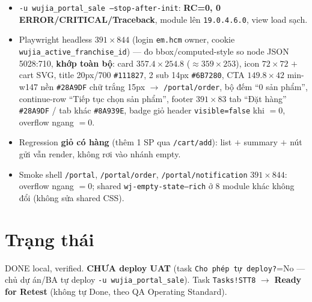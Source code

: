 \begin{itemize}
  \item \texttt{-u wujia\_portal\_sale --stop-after-init}: \textbf{RC=0, 0
    ERROR/CRITICAL/Traceback}, module lên \texttt{19.0.4.6.0}, view load sạch.
  \item Playwright headless $391\times844$ (login \texttt{em.hcm} owner, cookie
    \texttt{wujia\_active\_franchise\_id}) --- đo bbox/computed-style so node JSON 5028:710,
    \textbf{khớp toàn bộ}: card $357.4\times254.8$ ($\approx359\times253$), icon $72\times72$
    $+$ cart SVG, title 20px/700 \texttt{\#111827}, 2 sub 14px \texttt{\#6B7280}, CTA
    $149.8\times42$ min-w147 nền \texttt{\#28A9DF} chữ trắng 15px $\rightarrow$
    \texttt{/portal/order}, bộ đếm ``0 sản phẩm'', continue-row ``Tiếp tục chọn sản phẩm'',
    footer $391\times83$ tab ``Đặt hàng'' \texttt{\#28A9DF} / tab khác \texttt{\#8A939E},
    badge giỏ header \texttt{visible=false} khi $=0$, overflow ngang $=0$.
  \item Regression \textbf{giỏ có hàng} (thêm 1 SP qua \texttt{/cart/add}): list $+$ summary
    $+$ nút gửi vẫn render, không rơi vào nhánh empty.
  \item Smoke shell \texttt{/portal}, \texttt{/portal/order}, \texttt{/portal/notification}
    $391\times844$: overflow ngang $=0$; shared \texttt{wj-empty-state--rich} ở 8 module khác
    không đổi (không sửa shared CSS).
\end{itemize}

\section{Trạng thái}

DONE local, verified. \textbf{CHƯA deploy UAT} (task \texttt{Cho phép tự deploy?}=No ---
chủ dự án/BA tự deploy \texttt{-u wujia\_portal\_sale}). Task \texttt{Tasks!STT8} $\rightarrow$
\textbf{Ready for Retest} (không tự Done, theo QA Operating Standard).
